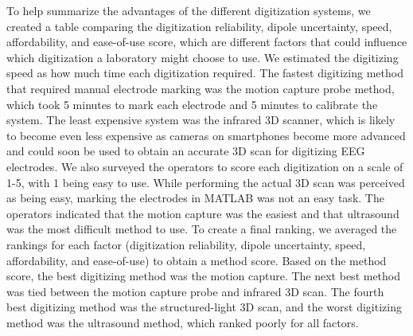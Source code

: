 \documentclass[../thesis_seyed.tex]{subfiles}
\begin{document}
To help summarize the advantages of the different digitization systems, we created a table comparing the digitization reliability, dipole uncertainty, speed, affordability, and ease-of-use score, which are different factors that could influence which digitization a laboratory might choose to use.%
We estimated the digitizing speed as how much time each digitization required. The fastest digitizing method that required manual electrode marking was the motion capture probe method, which took 5 minutes to mark each electrode and 5 minutes to calibrate the system. The least expensive system was the infrared 3D scanner, which is likely to become even less expensive as cameras on smartphones become more advanced and could soon be used to obtain an accurate 3D scan for digitizing EEG electrodes. We also surveyed the operators to score each digitization on a scale of 1-5, with 1 being easy to use. While performing the actual 3D scan was perceived as being easy, marking the electrodes in MATLAB was not an easy task. The operators indicated that the motion capture was the easiest and that ultrasound was the most difficult method to use. To create a final ranking, we averaged the rankings for each factor (digitization reliability, dipole uncertainty, speed, affordability, and ease-of-use) to obtain a method score. Based on the method score, the best digitizing method was the motion capture. The next best method was tied between the motion capture probe and infrared 3D scan. The fourth best digitizing method was the structured-light 3D scan, and the worst digitizing method was the ultrasound method, which ranked poorly for all factors.
\end{document}
